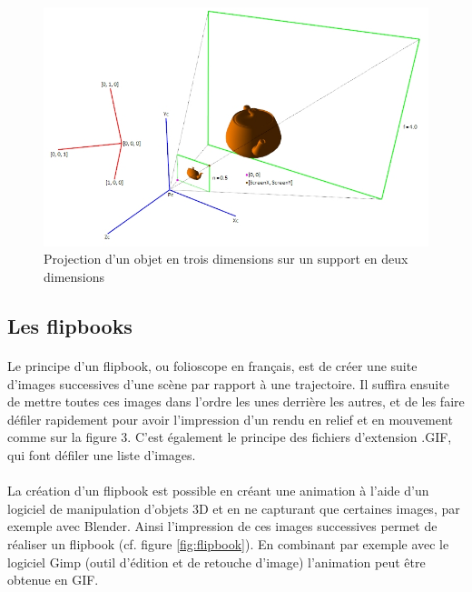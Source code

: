 \begin{figure}[h]
		\centering
		\includegraphics[scale=0.7]{projection.png}
		\caption{\label{fig:projection} Projection d’un objet en trois dimensions sur un support en deux dimensions \protect \footnotemark }
\end{figure}
	
	
\subsection{Les flipbooks}

\paragraph{}
	Le principe d’un flipbook, ou folioscope en français, est de créer une suite d’images successives d’une scène par rapport à une trajectoire. Il suffira ensuite de mettre toutes ces images dans l’ordre les unes derrière les autres, et de les faire défiler rapidement pour avoir l’impression d’un rendu en relief et en mouvement comme sur la figure 3. C’est également le principe des fichiers d’extension .GIF, qui font défiler une liste d’images.

        
\paragraph{}
	La création d’un flipbook est possible en créant une animation à l’aide d’un logiciel de manipulation d’objets 3D et en ne capturant que certaines images, par exemple avec Blender. Ainsi l’impression de ces images successives permet de réaliser un flipbook (cf. figure \ref{fig:flipbook}). En combinant par exemple avec le logiciel Gimp (outil d’édition et de retouche d’image) l’animation peut être obtenue en GIF. 

